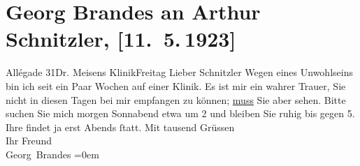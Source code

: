 

         
         \renewcommand{\erwaehntePersonen}{Personen: Georg Brandes, Valdemar Meisen}
         \renewcommand{\erwaehnteOrte}{Orte: Allégade, Kopenhagen, Meisen’s Klinik}
         \renewcommand{\erwaehnteWerke}{}
               \section[Georg Brandes an Arthur Schnitzler, {[}11. 5. 1923{]}]{ Georg Brandes an Arthur Schnitzler, {[}11. 5. 1923{]}}\nopagebreak{}\rehead{ }\begin{ledgroupsized}[t]{13cm}\normalsize\beginnumbering \toendnotes[C]{\smallbreak\pagebreak[2]} 
\toendnotes[C]{\smallbreak}\pstart
           \raggedleft{}{\pb}Allégade 31Dr. Meisens KlinikFreitag\pend
           \pstart{}Lieber Schnitzler\pend\pstart
           Wegen eines Unwohlseins bin ich seit ein Paar Wochen auf einer Klinik. Es ist mir ein wahrer Trauer, Sie
               nicht in diesen Tagen bei mir empfangen zu können; \uline{muss} Sie aber sehen.\pend
           \pstart
           Bitte suchen Sie mich morgen Sonnabend etwa um 2 und
               bleiben Sie ruhig bis gegen 5. Ihre \label{K_L02398-1v}\label{K_L02398-1h} findet ja erst Abends ſtatt.\pend
           \pstart
           Mit tausend Grüssen{\\[\baselineskip]}Ihr Freund{\\[\baselineskip]}\spacefill\mbox{Georg Brandes}\pend
           \leftskip=0em{}
         
         \endnumbering{}\end{ledgroupsized}  \newcommand{\dateiname}{L02398}\newcommand{\titel}{Georg Brandes an Arthur Schnitzler, [11. 5. 1923]}\newcommand{\editorInnen}{Martin Anton Müller und Gerd-Hermann Susen}
      